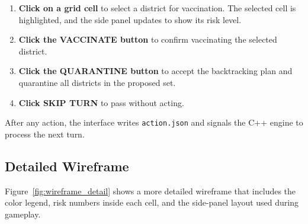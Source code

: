 \documentclass[conference]{IEEEtran}
\begin{document}
\begin{enumerate}
    \item \textbf{Click on a grid cell} to select a district for vaccination.
          The selected cell is highlighted, and the side panel updates to show
          its risk level.
    \item \textbf{Click the VACCINATE button} to confirm vaccinating the
          selected district.
    \item \textbf{Click the QUARANTINE button} to accept the backtracking plan
          and quarantine all districts in the proposed set.
    \item \textbf{Click SKIP TURN} to pass without acting.
\end{enumerate}

After any action, the interface writes \texttt{action.json} and signals the
C++ engine to process the next turn.

\subsection{Detailed Wireframe}

Figure~\ref{fig:wireframe_detail} shows a more detailed wireframe that
includes the color legend, risk numbers inside each cell, and the side-panel
layout used during gameplay.
\end{document}
